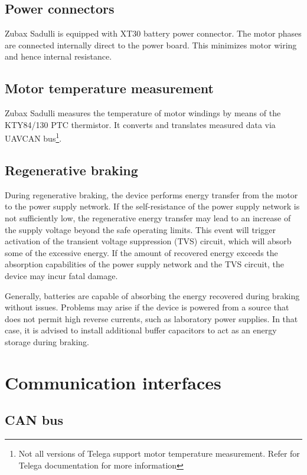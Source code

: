 \documentclass{zubaxdoc}
\begin{document}
\subsection{Power connectors}

Zubax Sadulli is equipped with XT30 battery power connector. 
The motor phases are connected internally direct to the power board. This minimizes motor wiring and 
hence internal resistance. 

\subsection{Motor temperature measurement}

Zubax Sadulli measures the temperature of motor windings by means of the KTY84/130 PTC thermistor. 
It converts and translates measured data via UAVCAN bus\footnote{Not all versions of Telega support 
motor temperature measurement. Refer for Telega documentation for more information}.  

\subsection{Regenerative braking}

During regenerative braking, the device performs energy transfer from the motor to the power supply network.
If the self-resistance of the power supply network is not sufficiently low,
the regenerative energy transfer may lead to an increase of the supply voltage beyond
the safe operating limits.
This event will trigger activation of the transient voltage suppression (TVS) circuit,
which will absorb some of the excessive energy.
If the amount of recovered energy exceeds the absorption capabilities of the power supply
network and the TVS circuit, the device may incur fatal damage.

Generally, batteries are capable of absorbing the energy recovered during braking without issues.
Problems may arise if the device is powered from a source that does not permit high reverse currents,
such as laboratory power supplies.
In that case, it is advised to install additional buffer capacitors to act as an energy storage
during braking.

\section{Communication interfaces}

\subsection{CAN bus}
\end{document}
